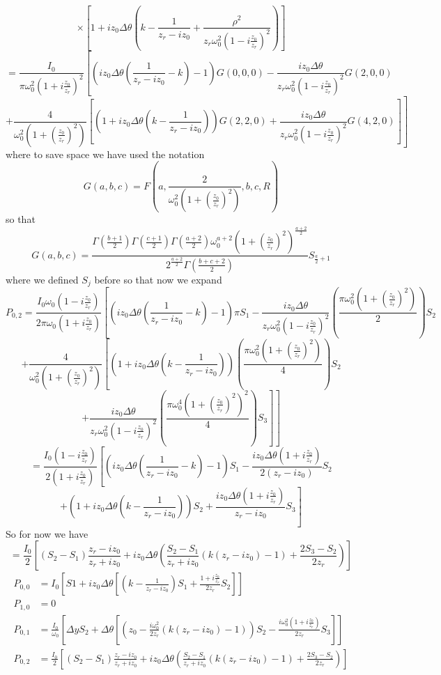 \documentclass[11pt]{amsart}
\makeatletter
\newcommand{\0}{\varnothing}		%
\newcommand{\1}{!}
\newcommand{\2}{@}
\newcommand{\3}{\#}
\newcommand{\4}{\$}
\newcommand{\5}{\%}
\newcommand{\6}{$^\wedge$}
\newcommand{\7}{\&}
\newcommand{\8}{*}
\newcommand{\9}{(}
\makeatother
\begin{document}
\[
\times\left[1+iz_0\Delta \theta\left(k-\frac{1}{z_r-iz_0} + \frac{\rho^2}{z_r\omega_0^2\left(1-i\frac{z_0}{z_r}\right)^2}\right)\right]
\]
\[
=\frac{I_0}{\pi\omega_0^2\left(1+i\frac{z_0}{z_r}\right)^2}\left[\left(iz_0 \Delta \theta\left(\frac{1}{z_r-iz_0}-k\right)-1\right)G(0,0,0)-\frac{iz_0\Delta \theta}{z_r\omega_0^2\left(1-i\frac{z_0}{z_r}\right)^2}G(2,0,0) \right.
\]
\[
\left.+\frac{4}{\omega_0^2\left(1+\left(\frac{z_0}{z_r}\right)^2\right)}\left[\left(1+iz_0\Delta \theta\left(k-\frac{1}{z_r-iz_0}\right)\right)G(2,2,0) + \frac{iz_0\Delta \theta}{z_r\omega_0^2\left(1-i\frac{z_0}{z_r}\right)^2}G(4,2,0)\right]\right]
\]
where to save space we have used the notation 
\[
G(a,b,c) = F\left(a,\frac{2}{\omega_0^2\left(1+\left(\frac{z_0}{z_r}\right)^2\right)},b,c,R\right)
\]
so that
\[
G(a,b,c) = \frac{\Gamma\left(\frac{b+1}{2}\right)\Gamma\left(\frac{c+1}{2}\right)\Gamma\left(\frac{a+2}{2}\right)\omega_0^{a+2}\left(1+\left(\frac{z_0}{z_r}\right)^2\right)^{\frac{a+2}{2}}}{2^{\frac{a+2}{2}}\Gamma\left(\frac{b+c+2}{2}\right)}S_{\frac{a}{2}+1}
\]
where we defined $S_j$ before so that now we expand
 \[
 P_{0,2} = \frac{I_0\omega_0\left(1-i\frac{z_0}{z_r}\right)}{2\pi \omega_0\left(1+i\frac{z_0}{z_r}\right)}\left[\left(iz_0\Delta \theta \left(\frac{1}{z_r-iz_0}-k\right)-1\right)\pi S_1-\frac{iz_0\Delta \theta}{z_r\omega_0^2\left(1-i\frac{z_0}{z_r}\right)^2}\left(\frac{\pi\omega_0^2\left(1+\left(\frac{z_0}{z_r}\right)^2\right)}{2}\right)S_2\right.
 \]
\[
\left. +\frac{4}{\omega_0^2\left(1+\left(\frac{z_0}{z_r}\right)^2\right)}\left[\left(1+iz_0\Delta \theta\left(k-\frac{1}{z_r-iz_0}\right)\right)\left(\frac{\pi\omega_0^2\left(1+\left(\frac{z_0}{z_r}\right)^2\right)}{4}\right)S_2\right.\right.
\]
\[
\left.\left.+\frac{iz_0\Delta \theta}{z_r\omega_0^2\left(1-i\frac{z_0}{z_r}\right)^2}\left(\frac{\pi\omega_0^4\left(1+\left(\frac{z_0}{z_r}\right)^2\right)^2}{4}\right)S_3\right]\right]
\]
\[
=\frac{I_0\left(1-i\frac{z_0}{z_r}\right)}{2\left(1+i\frac{z_0}{z_r}\right)}\left[\left(iz_0\Delta \theta\left(\frac{1}{z_r-iz_0}-k\right)-1\right)S_1-\frac{iz_0\Delta \theta\left(1+i\frac{z_0}{z_r}\right)}{2\left(z_r-iz_0\right)}S_2\right.
\]
\[
\left. +\left(1+iz_0\Delta \theta\left(k-\frac{1}{z_r-iz_0}\right)\right)S_2+\frac{iz_0\Delta \theta\left(1+i\frac{z_0}{z_r}\right)}{z_r-iz_0}S_3\right]
\]
So for now we have
\[
=\frac{I_0}{2}\left[\left(S_2-S_1\right)\frac{z_r-iz_0}{z_r+iz_0}+iz_0\Delta\theta\left(\frac{S_2-S_1}{z_r+iz_0}\left(k\left(z_r-iz_0\right)-1\right)+\frac{2S_3-S_2}{2z_r}\right)\right]
\]
\begin{align*}
P_{0,0} &= I_0\left[S1+iz_0\Delta \theta\left[\left(k-\frac{1}{z_r-iz_0}\right)S_1 + \frac{1+i\frac{z_0}{z_r}}{2z_r}S_2\right]\right]
\\
P_{1,0} &= 0
\\
P_{0,1} &= \frac{I_0}{\omega_0}\left[\Delta y S_2 + \Delta \theta\left[\left(z_0-\frac{i\omega_0^2}{2z_r}\left(k\left(z_r-iz_0\right)-1\right)\right)S_2 - \frac{i\omega_0^2\left(1+i\frac{z_0}{z_r}\right)}{2z_r}S_3\right]\right]
\\
P_{0,2} &= \frac{I_0}{2}\left[\left(S_2-S_1\right)\frac{z_r-iz_0}{z_r+iz_0}+iz_0\Delta\theta\left(\frac{S_2-S_1}{z_r+iz_0}\left(k\left(z_r-iz_0\right)-1\right)+\frac{2S_3-S_2}{2z_r}\right)\right]
\end{align*}
\end{document}
